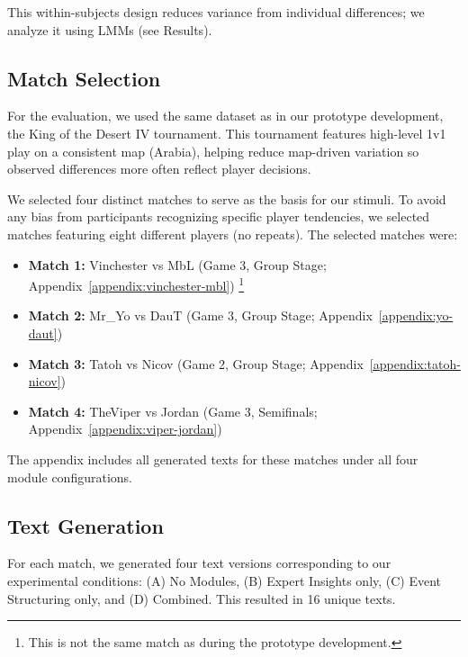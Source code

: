 This within-subjects design reduces variance from individual differences; we analyze it using LMMs (see Results).

\subsection{Match Selection}
\label{sec:match-selection}
For the evaluation, we used the same dataset as in our prototype development, the King of the Desert IV tournament. This tournament features high-level 1v1 play on a consistent map (Arabia), helping reduce map-driven variation so observed differences more often reflect player decisions.

We selected four distinct matches to serve as the basis for our stimuli. To avoid any bias from participants recognizing specific player tendencies, we selected matches featuring eight different players (no repeats). The selected matches were:

\begin{itemize}[noitemsep,topsep=0pt]
  \item \textbf{Match 1:} Vinchester vs MbL (Game 3, Group Stage; Appendix~\ref{appendix:vinchester-mbl}) \footnote{This is not the same match as during the prototype development.}
  \item \textbf{Match 2:} Mr\_Yo vs DauT (Game 3, Group Stage; Appendix~\ref{appendix:yo-daut})
  \item \textbf{Match 3:} Tatoh vs Nicov (Game 2, Group Stage; Appendix~\ref{appendix:tatoh-nicov})
  \item \textbf{Match 4:} TheViper vs Jordan (Game 3, Semifinals; Appendix~\ref{appendix:viper-jordan})
\end{itemize}

The appendix includes all generated texts for these matches under all four module configurations.

\subsection{Text Generation}
For each match, we generated four text versions corresponding to our experimental conditions: (A) No Modules, (B) Expert Insights only, (C) Event Structuring only, and (D) Combined. This resulted in 16 unique texts.

